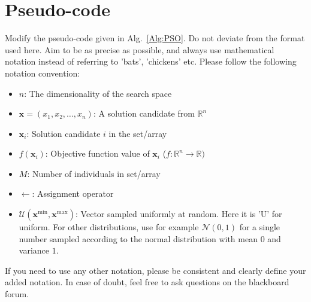\documentclass[runningheads]{llncs}
\begin{document}
\section{Pseudo-code}
Modify the pseudo-code given in Alg.~\ref{Alg:PSO}. Do not deviate from the format used here. Aim to be as precise as possible, and always use mathematical notation instead of referring to 'bats', 'chickens' etc. Please follow the following notation convention:
\begin{itemize}
    \item $n$: The dimensionality of the search space
    \item $\mathbf{x}=(x_1,x_2,\dots,x_n)$: A solution candidate from $\mathds{R}^n$
    \item $\mathbf{x}_i$: Solution candidate $i$ in the set/array
    \item $f(\mathbf{x}_i)$: Objective function value of $\mathbf{x}_i$ ($f: \mathds{R}^n \rightarrow \mathds{R})$
    \item $M$: Number of individuals in set/array
    \item $\leftarrow$: Assignment operator
    \item $\bm{\mathcal{U}}(\mathbf{x}^{\text{min}},\mathbf{x}^{\text{max}} )$: Vector sampled uniformly at random. Here it is 'U' for uniform. For other distributions, use for example $\bm{\mathcal{N}}(0,1)$ for a single number sampled according to the normal distribution with mean $0$ and variance $1$. 
\end{itemize}
If you need to use any other notation, please be consistent and clearly define your added notation. In case of doubt, feel free to ask questions on the blackboard forum. 
\end{document}
